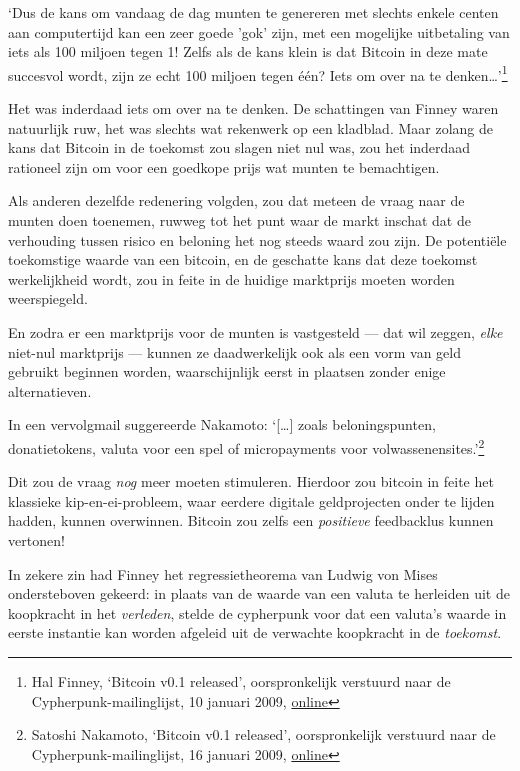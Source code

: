 \documentclass[smalldemyvopaper,11pt,twoside,onecolumn,openright,extrafontsizes,hidelinks]{memoir}
\begin{document}
`Dus de kans om vandaag de dag munten te genereren met slechts enkele
centen aan computertijd kan een zeer goede 'gok' zijn, met een mogelijke
uitbetaling van iets als 100 miljoen tegen 1! Zelfs als de kans klein is
dat Bitcoin in deze mate succesvol wordt, zijn ze echt 100 miljoen tegen
één? Iets om over na te denken\ldots'\footnote{Hal Finney, `Bitcoin v0.1
  released', oorspronkelijk verstuurd naar de Cypherpunk-mailinglijst,
  10 januari 2009,
  \href{https://www.metzdowd.com/pipermail/cryptography/2009-January/015004.html}{online}}

Het was inderdaad iets om over na te denken. De schattingen van Finney
waren natuurlijk ruw, het was slechts wat rekenwerk op een kladblad.
Maar zolang de kans dat Bitcoin in de toekomst zou slagen niet nul was,
zou het inderdaad rationeel zijn om voor een goedkope prijs wat munten
te bemachtigen.

Als anderen dezelfde redenering volgden, zou dat meteen de vraag naar de
munten doen toenemen, ruwweg tot het punt waar de markt inschat dat de
verhouding tussen risico en beloning het nog steeds waard zou zijn. De
potentiële toekomstige waarde van een bitcoin, en de geschatte kans dat
deze toekomst werkelijkheid wordt, zou in feite in de huidige marktprijs
moeten worden weerspiegeld.

En zodra er een marktprijs voor de munten is vastgesteld --- dat wil
zeggen, \emph{elke} niet-nul marktprijs --- kunnen ze daadwerkelijk ook
als een vorm van geld gebruikt beginnen worden, waarschijnlijk eerst in
plaatsen zonder enige alternatieven.

In een vervolgmail suggereerde Nakamoto: `{[}\ldots{]} zoals
beloningspunten, donatietokens, valuta voor een spel of micropayments
voor volwassenensites.'\footnote{Satoshi Nakamoto, `Bitcoin v0.1
  released', oorspronkelijk verstuurd naar de Cypherpunk-mailinglijst,
  16 januari 2009,
  \href{https://www.metzdowd.com/pipermail/cryptography/2009-January/015014.html}{online}}

Dit zou de vraag \emph{nog} meer moeten stimuleren. Hierdoor zou bitcoin
in feite het klassieke kip-en-ei-probleem, waar eerdere digitale
geldprojecten onder te lijden hadden, kunnen overwinnen. Bitcoin zou
zelfs een \emph{positieve} feedbacklus kunnen vertonen!

In zekere zin had Finney het regressietheorema van Ludwig von Mises
ondersteboven gekeerd: in plaats van de waarde van een valuta te
herleiden uit de koopkracht in het \emph{verleden}, stelde de cypherpunk
voor dat een valuta's waarde in eerste instantie kan worden afgeleid uit
de verwachte koopkracht in de \emph{toekomst}.
\end{document}
